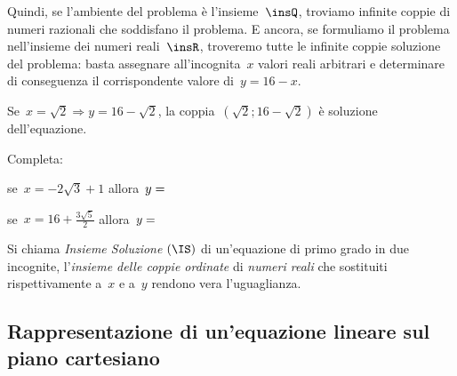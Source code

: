 \begin{soluzione}
Quindi, se l'ambiente del problema è
l'insieme~$\insQ$, troviamo infinite coppie di
numeri razionali che soddisfano il problema.
E ancora, se formuliamo il problema nell'insieme dei
numeri reali~$\insR$, troveremo tutte le infinite coppie
soluzione del problema: basta assegnare all'incognita~$x$
valori reali arbitrari e determinare di conseguenza il corrispondente
valore di~$y=16-x$.

Se~$x=\sqrt{2}\Rightarrow y=16-\sqrt{2}$, la 
coppia~$\left(\sqrt{2};16-\sqrt{2}\right)$ è soluzione
dell'equazione. 

Completa:

\begin{itemize*}
\item se~$x=-2\sqrt{3}+1$ allora~$y=\dotfill$
\item se~$x=16+\frac{3\sqrt{5}}{2}$ allora~$y=\dotfill$
\end{itemize*}
\end{soluzione}

\begin{definizione}
Si chiama \emph{Insieme Soluzione} $(\IS)$ di un'equazione di primo
grado in due incognite, l'\emph{insieme delle coppie
ordinate} di \emph{numeri reali} che sostituiti rispettivamente a~$x$ e
a~$y$ rendono vera l'uguaglianza.
\end{definizione}


\subsection{Rappresentazione di un'equazione lineare sul piano cartesiano}

